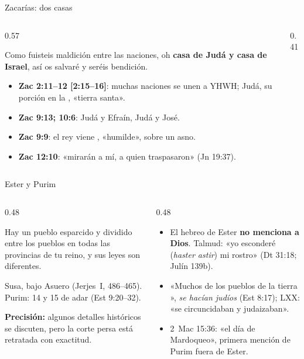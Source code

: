 \begin{frame}{Zacarías: dos casas}
\begin{columns}[c,onlytextwidth]
\begin{column}{0.57\textwidth}
\begin{cita}Como fuisteis maldición entre las naciones, oh \textbf{casa de Judá y casa de Israel}, así os salvaré y seréis bendición.\end{cita}
\scriptsize
\begin{itemize}
\item \textbf{Zac 2:11--12 [2:15--16]}: muchas naciones se unen a YHWH; Judá, su porción en la , «tierra santa».
\item \textbf{Zac 9:13; 10:6}: Judá y Efraín, Judá y José.
\item \textbf{Zac 9:9}: el rey viene , «humilde», sobre un asno.
\item \textbf{Zac 12:10}: «mirarán a mí, a quien traspasaron» (Jn 19:37).
\end{itemize}
\end{column}
\begin{column}{0.41\textwidth}\end{column}
\end{columns}
\end{frame}

\begin{frame}{Ester y Purim}
\begin{columns}[T,onlytextwidth]
\begin{column}{0.48\textwidth}
\begin{cita}Hay un pueblo esparcido y dividido entre los pueblos en todas las provincias de tu reino, y sus leyes son diferentes.\end{cita}
\small Susa, bajo Asuero (Jerjes~I, 486--465). Purim: 14 y 15 de adar (Est 9:20--32).\par\medskip
\begin{clave}\textbf{Precisión:} algunos detalles históricos se discuten, pero la corte persa está retratada con exactitud.\end{clave}
\end{column}
\begin{column}{0.48\textwidth}\footnotesize
\begin{itemize}
\item El hebreo de Ester \textbf{no menciona a Dios}. Talmud: «yo esconderé (\emph{haster astir}) mi rostro» (Dt 31:18; Julín 139b).\medskip
\item «Muchos de los pueblos de la tierra », \emph{se hacían judíos} (Est 8:17); LXX: «se circuncidaban y judaizaban».\medskip
\item 2~Mac 15:36: «el día de Mardoqueo», primera mención de Purim fuera de Ester.
\end{itemize}
\end{column}
\end{columns}
\end{frame}

